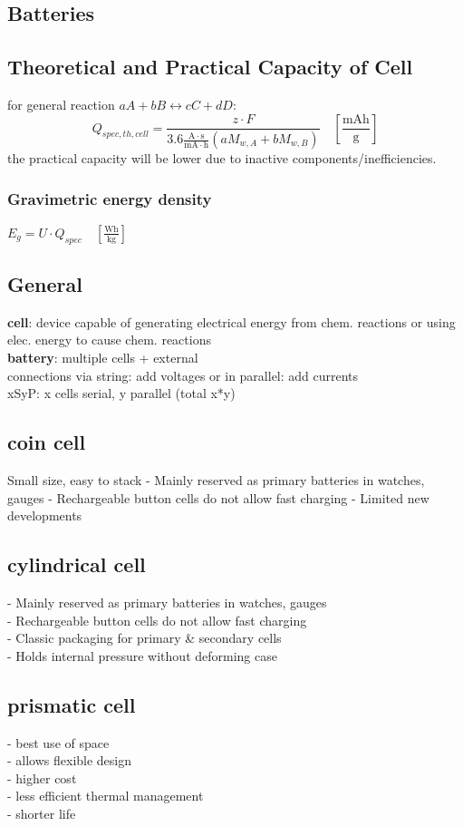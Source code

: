 \documentclass[a4paper,10pt,landscape]{scrartcl}
\begin{document}
\begin{multicols*}{3}
\section{Batteries}
\subsection{Theoretical and Practical Capacity of Cell}
for general reaction $aA+bB\leftrightarrow cC+dD$:
$$Q_{spec,th,cell}=\frac{z\cdot F}{3.6\mathrm{\frac{A\cdot s}{mA\cdot h}}\left(a M_{w,A}+b M_{w,B}\right)}  \quad\left[\mathrm{\frac{mAh}{g}}\right]$$
the practical capacity will be lower due to inactive components/inefficiencies.

\subsubsection{Gravimetric energy density}
$E_{g}=U\cdot Q_{spec}\quad \left[\mathrm{\frac{Wh}{kg}}\right]$

\subsection{General}
\textbf{cell}: device capable of generating electrical energy from chem. reactions or using elec. energy to cause chem. reactions \\
\textbf{battery}: multiple cells + external \\ connections via string: add voltages or in parallel: add currents \\
xSyP: x cells serial, y parallel (total x*y)
\subsection{coin cell}
Small size, easy to stack
- Mainly reserved as primary
batteries in watches, gauges
- Rechargeable button cells
do not allow fast charging
- Limited new developments 
\subsection{cylindrical cell}
- Mainly reserved as primary batteries in watches, gauges \\
- Rechargeable button cells do not allow fast charging \\
- Classic packaging for primary \& secondary cells \\
- Holds internal pressure without deforming case
\subsection{prismatic cell}
- best use of space \\
- allows flexible design \\
- higher cost \\
- less efficient thermal management \\
- shorter life

\end{multicols*}
\end{document}

